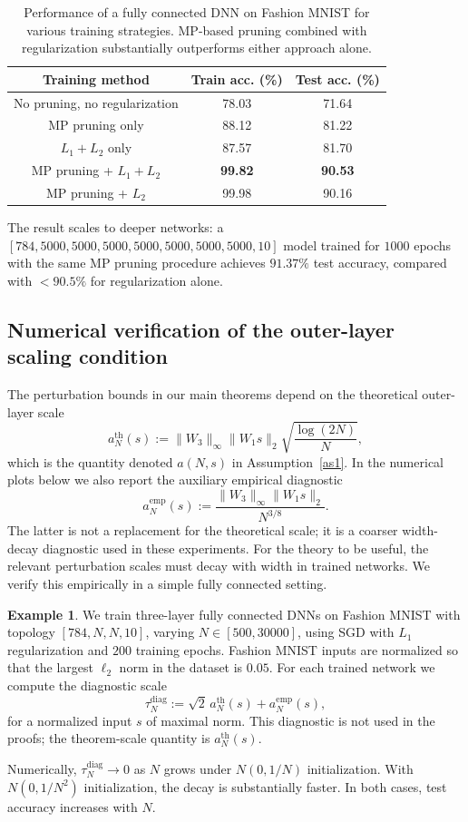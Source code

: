 \documentclass[11pt]{article}
\theoremstyle{plain}
\theoremstyle{definition}
\newtheorem{ex}[thm]{Example}
\theoremstyle{remark}
\newcommand{\1}{\mathbf{1}}
\begin{document}
\begin{table}[ht]
\centering
\begin{tabular}{|c|c|c|}
\hline
Training method & Train acc. (\%) & Test acc. (\%) \\
\hline
No pruning, no regularization & 78.03 & 71.64 \\
\hline
MP pruning only & 88.12 & 81.22 \\
\hline
\(L_1+L_2\) only & 87.57 & 81.70 \\
\hline
MP pruning + \(L_1+L_2\) & \textbf{99.82} & \textbf{90.53} \\
\hline
MP pruning + \(L_2\) & 99.98 & 90.16 \\
\hline
\end{tabular}
\caption{Performance of a fully connected DNN on Fashion MNIST for various training strategies. MP-based pruning combined with regularization substantially outperforms either approach alone.}
\label{full_connected_acc_results}
\end{table}

The result scales to deeper networks: a \([784,5000,5000,5000,5000,5000,5000,5000,10]\) model trained for \(1000\) epochs with the same MP pruning procedure achieves \(91.37\%\) test accuracy, compared with \(<90.5\%\) for regularization alone.

\subsection{Numerical verification of the outer-layer scaling condition}
\label{app:outer_layer_scaling}

The perturbation bounds in our main theorems depend on the theoretical outer-layer scale
\[
a_N^{\mathrm{th}}(s)
:=
\|W_3\|_\infty\|W_1s\|_2\sqrt{\frac{\log(2N)}{N}},
\]
which is the quantity denoted \(a(N,s)\) in Assumption~\ref{as1}. In the numerical plots below we also report the auxiliary empirical diagnostic
\[
a_N^{\mathrm{emp}}(s)
:=
\frac{\|W_3\|_\infty\|W_1s\|_2}{N^{3/8}}.
\]
The latter is not a replacement for the theoretical scale; it is a coarser width-decay diagnostic used in these experiments. For the theory to be useful, the relevant perturbation scales must decay with width in trained networks. We verify this empirically in a simple fully connected setting.

\begin{ex}
\label{ex:outer_layer_scaling}
We train three-layer fully connected DNNs on Fashion MNIST with topology \([784,N,N,10]\), varying \(N\in[500,30000]\), using SGD with \(L_1\) regularization and \(200\) training epochs. Fashion MNIST inputs are normalized so that the largest \(\ell_2\) norm in the dataset is \(0.05\). For each trained network we compute the diagnostic scale
\[
\tau_N^{\mathrm{diag}}
:=
\sqrt2\,a_N^{\mathrm{th}}(s)
+
a_N^{\mathrm{emp}}(s),
\]
for a normalized input \(s\) of maximal norm. This diagnostic is not used in the proofs; the theorem-scale quantity is \(a_N^{\mathrm{th}}(s)\).

Numerically, \(\tau_N^{\mathrm{diag}}\to0\) as \(N\) grows under \(N(0,1/N)\) initialization. With \(N(0,1/N^2)\) initialization, the decay is substantially faster. In both cases, test accuracy increases with \(N\).
\end{ex}
\end{document}
